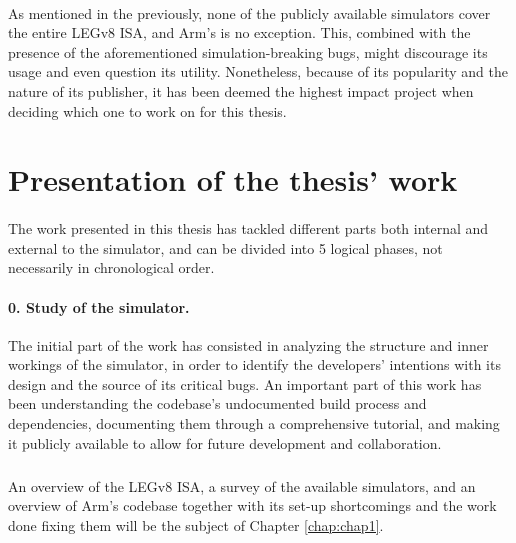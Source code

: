 \paragraph{}
As mentioned in the previously, none of the publicly available simulators cover the entire LEGv8 ISA, and Arm's is no exception. This, combined with the presence of the aforementioned simulation-breaking bugs, might discourage its usage and even question its utility. Nonetheless, because of its popularity and the nature of its publisher, it has been deemed the highest impact project when deciding which one to work on for this thesis. 

\section*{Presentation of the thesis' work}
\paragraph{}
The work presented in this thesis has tackled different parts both internal and external to the simulator, and can be divided into 5 logical phases, not necessarily in chronological order.

\paragraph{0. Study of the simulator.}
The initial part of the work has consisted in analyzing the structure and inner workings of the simulator, in order to identify the developers' intentions with its design and the source of its critical bugs. An important part of this work has been understanding the codebase's undocumented build process and dependencies, documenting them through a comprehensive tutorial, and making it publicly available to allow for future development and collaboration.
\subparagraph{}
An overview of the LEGv8 ISA, a survey of the available simulators, and an overview of Arm's codebase together with its set-up shortcomings and the work done fixing them will be the subject of Chapter \ref{chap:chap1}.

